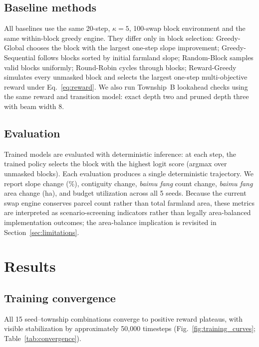 \documentclass[preprint,12pt]{elsarticle}
\begin{document}
\subsection{Baseline methods}
\label{sec:baselines}

All baselines use the same 20-step, $\kappa=5$, 100-swap block environment and the same within-block greedy engine. They differ only in block selection: Greedy-Global chooses the block with the largest one-step slope improvement; Greedy-Sequential follows blocks sorted by initial farmland slope; Random-Block samples valid blocks uniformly; Round-Robin cycles through blocks; Reward-Greedy simulates every unmasked block and selects the largest one-step multi-objective reward under Eq.~\ref{eq:reward}. We also run Township~B lookahead checks using the same reward and transition model: exact depth two and pruned depth three with beam width 8.

\subsection{Evaluation}

Trained models are evaluated with deterministic inference: at each step, the trained policy selects the block with the highest logit score (argmax over unmasked blocks). Each evaluation produces a single deterministic trajectory. We report slope change (\%), contiguity change, \textit{baimu fang} count change, \textit{baimu fang} area change (ha), and budget utilization across all 5 seeds. Because the current swap engine conserves parcel count rather than total farmland area, these metrics are interpreted as scenario-screening indicators rather than legally area-balanced implementation outcomes; the area-balance implication is revisited in Section~\ref{sec:limitations}.


\section{Results}
\label{sec:results}

\subsection{Training convergence}
\label{sec:convergence}

All 15 seed--township combinations converge to positive reward plateaus, with visible stabilization by approximately 50{,}000 timesteps (Fig.~\ref{fig:training_curves}; Table~\ref{tab:convergence}).
\end{document}

